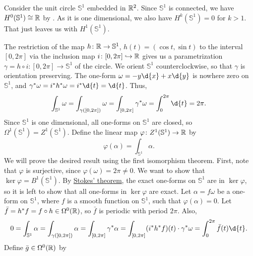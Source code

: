 \documentclass[a4paper,12pt]{article}
\begin{document}
\begin{example}
    Consider the unit circle $\mathbb{S}^1$ embedded in $\mathbb{R}^2$.
    Since $\mathbb{S}^1$ is connected, we have $H^0(\mathbb{S}^1) \cong \mathbb{R}$ by .
    As it is one dimensional, we also have $H^k(\mathbb{S}^1) = 0$ for $k > 1$.
    That just leaves us with $H^1(\mathbb{S}^1)$.

    The restriction of the map $h \colon \mathbb{R} \to \mathbb{S}^1$, $h(t) = (\cos t, \sin t)$ to the interval $[0, 2\pi]$ via the inclusion map $i \colon [0, 2\pi] \hookrightarrow \mathbb{R}$ gives us a parametrization $\gamma = h \circ i \colon [0, 2\pi] \to \mathbb{S}^1$ of the circle.
    We orient $\mathbb{S}^1$ counterclockwise, so that $\gamma$ is orientation preserving.
    The one-form $\omega = -y \d{x} + x \d{y}$ is nowhere zero on $\mathbb{S}^1$, and $\gamma^*\omega = i^*h^*\omega = i^*\d{t} = \d{t}$.
    Thus,
    \begin{equation*}
        \int_{\mathbb{S}^1} \omega = \int_{\gamma([0, 2\pi])} \omega = \int_{[0, 2\pi]} \gamma^*\omega = \int_0^{2\pi} \d{t} = 2\pi.
    \end{equation*}
    Since $\mathbb{S}^1$ is one dimensional, all one-forms on $\mathbb{S}^1$ are closed, so $\Omega^1(\mathbb{S}^1) = Z^1(\mathbb{S}^1)$.
    Define the linear map $\varphi \colon Z^1(\mathbb{S}^1) \to \mathbb{R}$ by
    \begin{equation}
        \varphi(\alpha) = \int_{\mathbb{S}^1} \alpha.
    \end{equation}
    We will prove the desired result using the first isomorphism theorem.
    First, note that $\varphi$ is surjective, since $\varphi(\omega) = 2\pi \neq 0$.
    We want to show that $\ker \varphi = B^1(\mathbb{S}^1)$.
    By \hyperref[thm:stokes'_theorem]{Stokes' theorem}, the exact one-forms on $\mathbb{S}^1$ are in $\ker \varphi$, so it is left to show that all one-forms in $\ker \varphi$ are exact.
    Let $\alpha = f\omega$ be a one-form on $\mathbb{S}^1$, where $f$ is a smooth function on $\mathbb{S}^1$, such that $\varphi(\alpha) = 0$.
    Let $\bar{f} = h^*f = f \circ h \in \Omega^0(\mathbb{R})$, so $\bar{f}$ is periodic with period $2\pi$.
    Also,
    \begin{equation*}
        0 = \int_{\mathbb{S}^1} \alpha = \int_{\gamma([0, 2\pi])} \alpha = \int_{[0, 2\pi]} \gamma^*\alpha = \int_{[0, 2\pi]} (i^*h^*f)(t) \cdot \gamma^*\omega = \int_0^{2\pi} \bar{f}(t) \d{t}.
    \end{equation*}
    Define $\bar{g} \in \Omega^0(\mathbb{R})$ by
    \begin{equation}

\end{equation}
\end{example}
\end{document}
